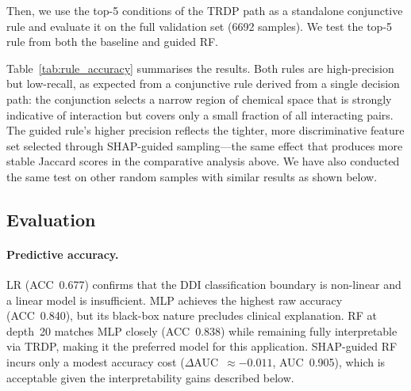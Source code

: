 \documentclass[letterpaper]{article} %
\begin{document}
Then, we use the top-5 conditions of the TRDP path as a standalone conjunctive rule and evaluate it on the full validation set (6692 samples). We test the top-5 rule from both the baseline and guided RF.

Table~\ref{tab:rule_accuracy} summarises the results. Both rules are high-precision but low-recall, as expected from a conjunctive rule derived from a single decision path: the conjunction selects a narrow region of chemical space that is strongly indicative of interaction but covers only a small fraction of all interacting pairs. The guided rule's higher precision reflects the tighter, more discriminative feature set selected through SHAP-guided sampling---the same effect that produces more stable Jaccard scores in the comparative analysis above. We have also conducted the same test on other random samples with similar results as shown below.

\begin{table}[h]
\centering
\caption{Top-5-condition TRDP rule applied to the full validation set (6{,}692 samples).}%
\label{tab:rule_accuracy}
\end{table}



\subsection{Evaluation}

\paragraph{Predictive accuracy.}
LR (ACC~0.677) confirms that the DDI classification boundary is non-linear and a linear model is insufficient. MLP achieves the highest raw accuracy (ACC~0.840), but its black-box nature precludes clinical explanation. RF at depth~20 matches MLP closely (ACC~0.838) while remaining fully interpretable via TRDP, making it the preferred model for this application. SHAP-guided RF incurs only a modest accuracy cost ($\Delta$AUC~$\approx -0.011$, AUC~0.905), which is acceptable given the interpretability gains described below.
\end{document}
